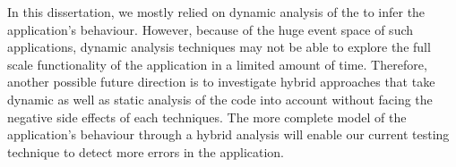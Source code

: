 In this dissertation, we mostly relied on dynamic analysis of the \javascript to infer the application's behaviour. However, because of the huge event space of such applications, dynamic analysis techniques may not be able to explore the full scale functionality of the application in a limited amount of time. Therefore, another possible future direction is to investigate hybrid approaches that take dynamic as well as static analysis of the code into account without facing the negative side effects of each techniques. The more complete model of the application's behaviour through a hybrid analysis will enable our current testing technique to detect more errors in the application.  



